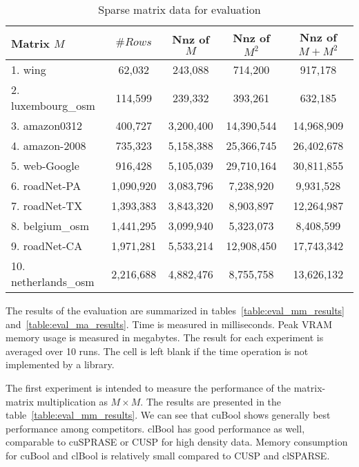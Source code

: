 {\setlength{\tabcolsep}{0.3em}
\begin{table}
\centering
{
\caption{Sparse matrix data for evaluation}
\label{table:sparse_matrices}
\scriptsize
{}
\begin{tabular}{|l|c|c|c|c|}
\hline
Matrix $M$           & $\# Rows$    & Nnz of $M$   & Nnz of $M^2$   & Nnz of $M + M^2$ \\
\hline
\hline
1.  wing             &    62,032    &   243,088    &    714,200     &    917,178       \\
2.  luxembourg\_osm  &   114,599    &   239,332    &    393,261     &    632,185       \\
3.  amazon0312       &   400,727    & 3,200,400    & 14,390,544     & 14,968,909       \\
4.  amazon-2008      &   735,323    & 5,158,388    & 25,366,745     & 26,402,678       \\
5.  web-Google       &   916,428    & 5,105,039    & 29,710,164     & 30,811,855       \\
6.  roadNet-PA       & 1,090,920    & 3,083,796    &  7,238,920     &  9,931,528       \\
7.  roadNet-TX       & 1,393,383    & 3,843,320    &  8,903,897     & 12,264,987       \\
8.  belgium\_osm     & 1,441,295    & 3,099,940    &  5,323,073     &  8,408,599       \\
9.  roadNet-CA       & 1,971,281    & 5,533,214    & 12,908,450     & 17,743,342       \\
10. netherlands\_osm & 2,216,688    & 4,882,476    &  8,755,758     & 13,626,132       \\ 
\hline
\end{tabular}
}
\end{table}
}

The results of the evaluation are summarized in tables~\ref{table:eval_mm_results} and~\ref{table:eval_ma_results}.
Time is measured in milliseconds. 
Peak VRAM memory usage is measured in megabytes.
The result for each experiment is averaged over 10 runs.
The cell is left blank if the time operation is not implemented by a library.

The first experiment is intended to measure the performance of the matrix-matrix multiplication as $M \times M$.
The results are presented in the table~\ref{table:eval_mm_results}.
We can see that cuBool shows generally best performance among competitors.
clBool has good performance as well, comparable to cuSPRASE or CUSP for high density data.  
Memory consumption for cuBool and clBool is relatively small compared to CUSP and clSPARSE. 


